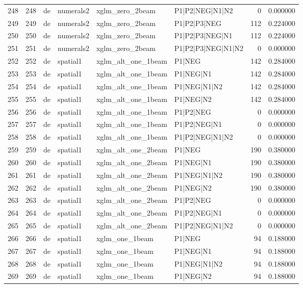 \begin{tabular}{lrllllrr}
248 & 248 & de & numerals2 & xglm_zero_2beam & P1|P2|NEG|N1|N2 & 0 & 0.000000 \\
249 & 249 & de & numerals2 & xglm_zero_2beam & P1|P2|P3|NEG & 112 & 0.224000 \\
250 & 250 & de & numerals2 & xglm_zero_2beam & P1|P2|P3|NEG|N1 & 112 & 0.224000 \\
251 & 251 & de & numerals2 & xglm_zero_2beam & P1|P2|P3|NEG|N1|N2 & 0 & 0.000000 \\
252 & 252 & de & spatial1 & xglm_alt_one_1beam & P1|NEG & 142 & 0.284000 \\
253 & 253 & de & spatial1 & xglm_alt_one_1beam & P1|NEG|N1 & 142 & 0.284000 \\
254 & 254 & de & spatial1 & xglm_alt_one_1beam & P1|NEG|N1|N2 & 142 & 0.284000 \\
255 & 255 & de & spatial1 & xglm_alt_one_1beam & P1|NEG|N2 & 142 & 0.284000 \\
256 & 256 & de & spatial1 & xglm_alt_one_1beam & P1|P2|NEG & 0 & 0.000000 \\
257 & 257 & de & spatial1 & xglm_alt_one_1beam & P1|P2|NEG|N1 & 0 & 0.000000 \\
258 & 258 & de & spatial1 & xglm_alt_one_1beam & P1|P2|NEG|N1|N2 & 0 & 0.000000 \\
259 & 259 & de & spatial1 & xglm_alt_one_2beam & P1|NEG & 190 & 0.380000 \\
260 & 260 & de & spatial1 & xglm_alt_one_2beam & P1|NEG|N1 & 190 & 0.380000 \\
261 & 261 & de & spatial1 & xglm_alt_one_2beam & P1|NEG|N1|N2 & 190 & 0.380000 \\
262 & 262 & de & spatial1 & xglm_alt_one_2beam & P1|NEG|N2 & 190 & 0.380000 \\
263 & 263 & de & spatial1 & xglm_alt_one_2beam & P1|P2|NEG & 0 & 0.000000 \\
264 & 264 & de & spatial1 & xglm_alt_one_2beam & P1|P2|NEG|N1 & 0 & 0.000000 \\
265 & 265 & de & spatial1 & xglm_alt_one_2beam & P1|P2|NEG|N1|N2 & 0 & 0.000000 \\
266 & 266 & de & spatial1 & xglm_one_1beam & P1|NEG & 94 & 0.188000 \\
267 & 267 & de & spatial1 & xglm_one_1beam & P1|NEG|N1 & 94 & 0.188000 \\
268 & 268 & de & spatial1 & xglm_one_1beam & P1|NEG|N1|N2 & 94 & 0.188000 \\
269 & 269 & de & spatial1 & xglm_one_1beam & P1|NEG|N2 & 94 & 0.188000 \\

\end{tabular}
